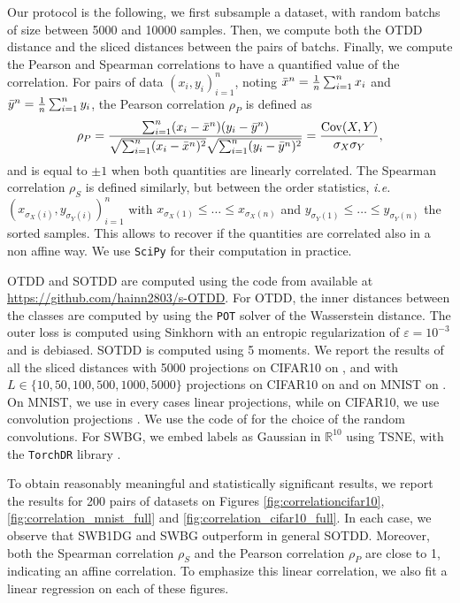 \documentclass[twoside]{article}
\newcommand{\R}{\mathbb{R}}
\begin{document}
Our protocol is the following, we first subsample a dataset, with random batchs of size between 5000 and 10000 samples. Then, we compute both the OTDD distance and the sliced distances between the pairs of batchs. Finally, we compute the Pearson and Spearman correlations to have a quantified value of the correlation. For pairs of data $(x_i,y_i)_{i=1}^n$, noting $\Bar{x}^n = \frac1n\sum_{i=1}^n x_i$ and $\Bar{y}^n = \frac1n\sum_{i=1}^n y_i$, the Pearson correlation $\rho_P$ is defined as
\begin{equation}
    \rho_P = \frac{\sum_{i=1}^n (x_i-\Bar{x}^n)(y_i-\Bar{y}^n)}{\sqrt{\sum_{i=1}^n (x_i - \Bar{x}^n)^2} \sqrt{\sum_{i=1}^n (y_i - \Bar{y}^n)^2}} = \frac{\mathrm{Cov}(X, Y)}{\sigma_X\sigma_Y},
\end{equation}
and is equal to $\pm 1$ when both quantities are linearly correlated. The Spearman correlation $\rho_S$ is defined similarly, but between the order statistics, \emph{i.e.} $(x_{\sigma_X(i)}, y_{\sigma_Y(i)})_{i=1}^n$ with $x_{\sigma_X(1)}\le \dots \le x_{\sigma_X(n)}$ and $y_{\sigma_Y(1)}\le \dots \le y_{\sigma_Y(n)}$ the sorted samples. This allows to recover if the quantities are correlated also in a non affine way. We use \texttt{SciPy} \citep{2020SciPy-NMeth} for their computation in practice.

OTDD and SOTDD are computed using the code from \citet{nguyen2025lightspeed} available at \url{https://github.com/hainn2803/s-OTDD}. For OTDD, the inner distances between the classes are computed by using the \texttt{POT} solver \citep{flamary2021pot, flamary2024pot} of the Wasserstein distance. The outer loss is computed using  Sinkhorn with an entropic regularization of $\varepsilon=10^{-3}$ and is debiased. SOTDD is computed using 5 moments. We report the results of all the sliced distances with 5000 projections on CIFAR10 on , and with $L\in\{10,50,100,500,1000,5000\}$ projections on CIFAR10 on  and on MNIST on . On MNIST, we use in every cases linear projections, while on CIFAR10, we use convolution projections \citep{nguyen2022revisiting}. We use the code of \citep{nguyen2025lightspeed} for the choice of the random convolutions. For SWBG, we embed labels as Gaussian in $\R^{10}$ using TSNE, with the \texttt{TorchDR} library \citep{torchdr}.

To obtain reasonably meaningful and statistically significant results, we report the results for 200 pairs of datasets on Figures \ref{fig:correlationcifar10}, \ref{fig:correlation_mnist_full} and \ref{fig:correlation_cifar10_full}. In each case, we observe that SWB1DG and SWBG outperform in general SOTDD. Moreover, both the Spearman correlation $\rho_S$ and the Pearson correlation $\rho_P$ are close to 1, indicating an affine correlation. To emphasize this linear correlation, we also fit a linear regression on each of these figures.
\end{document}
